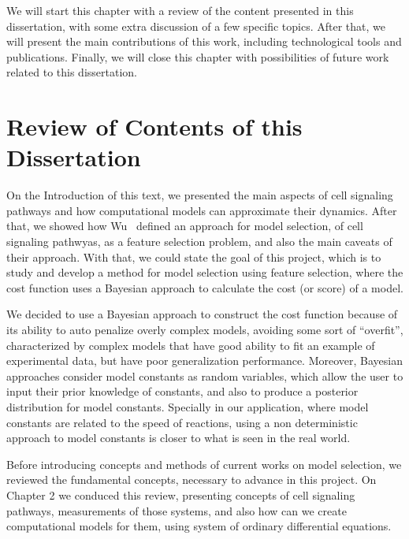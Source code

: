 We will start this chapter with a review of the content presented in 
this dissertation, with some extra discussion of a few specific topics.
After that, we will present the main contributions of this work,
including technological tools and publications. Finally, we will close
this chapter with possibilities of future work related to this
dissertation.


\section{Review of Contents of this Dissertation}
On the Introduction of this text, we presented the main aspects of cell
signaling pathways and how computational models can approximate their
dynamics. After that, we showed how Wu~\cite{Wu15} defined an approach
for model selection, of cell signaling pathwyas, as a feature selection
problem, and also the main caveats of their approach. With that, we
could state the goal of this project, which is to study and develop a
method for model selection using feature selection, where the cost 
function uses a Bayesian approach to calculate the cost (or score) of a
model.

We decided to use a Bayesian approach to construct the cost function
because of its ability to auto penalize overly complex models, avoiding
some sort of ``overfit'', characterized by complex models that have good
ability to fit an example of experimental data, but have poor
generalization performance. Moreover, Bayesian approaches consider model
constants as random variables, which allow the user to input their prior
knowledge of constants, and also to produce a posterior distribution
for model constants. Specially in our application, where model constants
are related to the speed of reactions, using a non deterministic 
approach to model constants is closer to what is seen in the real world.


Before introducing concepts and methods of current works on model 
selection, we reviewed the fundamental concepts, necessary to advance in
this project. On Chapter 2 we conduced this review, presenting concepts
of cell signaling pathways, measurements of those systems, and also how
can we create computational models for them, using system of ordinary
differential equations. %


